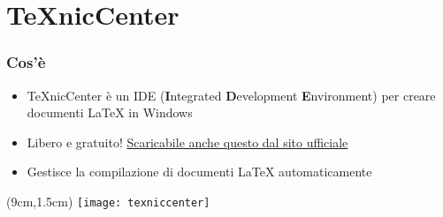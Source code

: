 \section{TeXnicCenter}
  \begin{frame}
    \frametitle{Cos'è}
    
    \begin{itemize}
      \item TeXnicCenter è un IDE (\textbf{I}ntegrated \textbf{D}evelopment 
\textbf{E}nvironment) per creare documenti \LaTeX{} in Windows
      \item Libero e gratuito! 
\href{http://www.texniccenter.org/download/}{Scaricabile anche questo dal sito 
ufficiale}
      \item Gestisce la compilazione di documenti \LaTeX{} automaticamente
    \end{itemize}
    
    \begin{textblock*}{5cm}(9cm,1.5cm)
      \texttt{[image: texniccenter]}
    \end{textblock*}

  \end{frame}